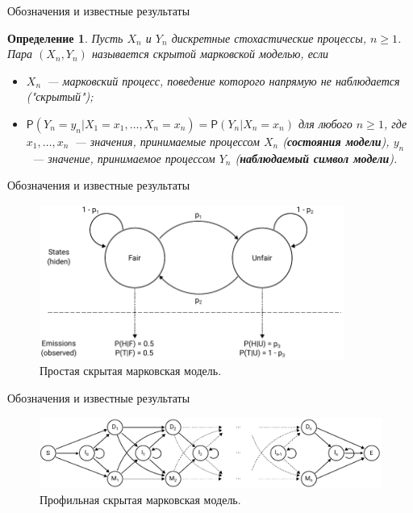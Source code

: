 \documentclass{beamer}
\newtheorem{defenition}{Определение}
\begin{document}
	\begin{frame}{Обозначения и известные результаты}
		\begin{defenition}
			Пусть $X_{n}$ и $Y_{n}$ дискретные стохастические процессы, $n \geq 1$. Пара $(X_{n}, Y_{n})$ называется скрытой марковской моделью, если
			\begin{itemize}
				\item $X_{n}$~--- марковский процесс, поведение которого напрямую не наблюдается ("скрытый");
				\item $\mathsf{P}(Y_{n} = y_{n}|X_{1} = x_{1},\dots, X_{n} = x_{n}) = \mathsf{P}(Y_{n}|X_{n}=x_{n})$ для любого $n \geq 1$, где $x_{1},\dots,x_{n}$~--- значения, принимаемые процессом  $X_{n}$ (\textbf{состояния модели}), $ y_{n}$~--- значение, принимаемое процессом $Y_{n}$ (\textbf{наблюдаемый символ модели}).
			\end{itemize}
		\end{defenition}		
	\end{frame}

	\begin{frame}{Обозначения и известные результаты}
		\begin{figure}[h]
			\includegraphics[width=10cm]{../report/figure1}
			\caption{Простая скрытая марковская модель.} \label{fg:1}
		\end{figure}
	\end{frame}

	\begin{frame}{Обозначения и известные результаты}
		\begin{figure}[h]
			\includegraphics[width=12cm]{../report/figure2}
			\caption{Профильная скрытая марковская модель.}  \label{fg:2}
		\end{figure}		
	\end{frame}
\end{document}
